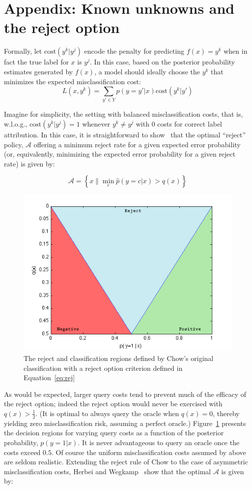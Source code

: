 \appendix
\section*{Appendix: Known unknowns and the reject option}
\label{app:reject}

Formally, let $\mbox{cost}(y^k | y^j)$ encode the penalty for predicting $f(x) = y^k$ when in fact the true label for $x$ is $y^j$. In this case, based on the posterior probability estimates generated by $f(x)$, a model should ideally choose the $y^k$ that minimizes the expected misclassification cost: $$L(x, y^k) = \sum_{y' \in Y} p(y = y' | x) \mbox{cost}(y^k | y')$$

Imagine for simplicity, the setting with balanced misclassification costs, that is, w.l.o.g., $\mbox{cost}(y^k | y^j) = 1$ whenever $y^k \neq y^j$ with $0$ costs for correct label attribution.  In this case, it is straightforward to show~\cite{chow:57,chow:70} that the optimal ``reject'' policy, $\mathcal{A}$ offering a minimum reject rate for a given expected error probability (or, equivalently, minimizing the expected error probability for a given reject rate) is given by:

\begin{equation}
\mathcal{A} = \left\{ x \| \min_c \hat{p}(y = c | x) > q(x) \right\}
\label{eq:rej}
\end{equation}

\begin{figure}[hbt]
\begin{center}
\includegraphics[width= 0.6 \columnwidth]{plots/reject_decision_bounds_fill.png}
\end{center}
\caption{The reject and classification regions defined by Chow's original classification with a reject option criterion defined in Equation~\ref{eq:rej}}
\label{fig:rejectdecision}
\end{figure}

As would be expected, larger query costs tend to prevent much of the efficacy of the reject option; indeed the reject option would never be exercised with $q(x)>\frac{1}{2}$. (It is optimal to always query the oracle when $q(x) = 0$, thereby yielding zero misclassification risk, assuming a perfect oracle.) Figure~\ref{fig:rejectdecision} presents the decision regions for varying query costs as a function of the posterior probability, $p(y=1|x)$. It is never advantageous to query an oracle once the costs exceed $0.5$.  Of course the uniform misclassification costs assumed by above are seldom realistic. Extending the reject rule of Chow to the case of asymmetric misclassification costs, Herbei and Wegkamp~\cite{herbei:2005} show that the optimal $\mathcal{A}$ is given by: 

